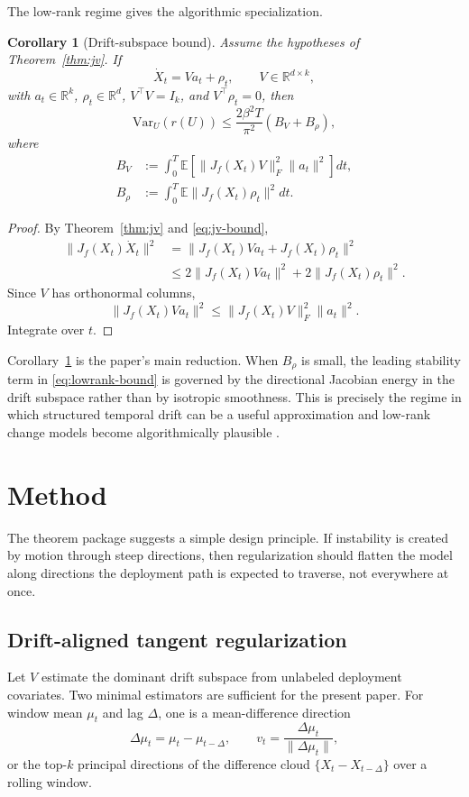 \documentclass[conference]{IEEEtran}
\newtheorem{corollary}{Corollary}
\newcommand{\E}{\mathbb{E}}
\newcommand{\Var}{\mathrm{Var}}
\newcommand{\R}{\mathbb{R}}
\begin{document}
The low-rank regime gives the algorithmic specialization.

\begin{corollary}[Drift-subspace bound]
\label{cor:lowrank}
Assume the hypotheses of Theorem~\ref{thm:jv}. If
\[
\dot X_t = Va_t + \rho_t,
\qquad
V\in\R^{d\times k},
\]
with $a_t\in\R^k$, $\rho_t\in\R^d$, $V^\top V=I_k$, and $V^\top \rho_t=0$, then
\begin{equation}
\label{eq:lowrank-bound}
\Var_U(r(U))
\le
\frac{2\beta^2 T}{\pi^2}(B_V+B_\rho),
\end{equation}
where
\begin{align*}
B_V &:= \int_0^T \E[\|J_f(X_t)V\|_F^2\|a_t\|^2]dt, \\
B_\rho &:= \int_0^T \E\|J_f(X_t)\rho_t\|^2dt.
\end{align*}
\end{corollary}

\begin{proof}
By Theorem~\ref{thm:jv} and \eqref{eq:jv-bound},
\[
\begin{aligned}
\|J_f(X_t)\dot X_t\|^2
&=
\|J_f(X_t)Va_t+J_f(X_t)\rho_t\|^2 \\
&\le
2\|J_f(X_t)Va_t\|^2+2\|J_f(X_t)\rho_t\|^2.
\end{aligned}
\]
Since $V$ has orthonormal columns,
\[
\|J_f(X_t)Va_t\|^2 \le \|J_f(X_t)V\|_F^2\|a_t\|^2.
\]
Integrate over $t$.
\end{proof}

Corollary~\ref{cor:lowrank} is the paper's main reduction. When $B_\rho$ is small, the leading stability term in \eqref{eq:lowrank-bound} is governed by the directional Jacobian energy in the drift subspace rather than by isotropic smoothness. This is precisely the regime in which structured temporal drift can be a useful approximation \cite{yao-wildtime} and low-rank change models become algorithmically plausible \cite{xie-lowrank-allerton2016}.

\section{Method}
The theorem package suggests a simple design principle. If instability is created by motion through steep directions, then regularization should flatten the model along directions the deployment path is expected to traverse, not everywhere at once.

\subsection{Drift-aligned tangent regularization}
Let $V$ estimate the dominant drift subspace from unlabeled deployment covariates. Two minimal estimators are sufficient for the present paper. For window mean $\mu_t$ and lag $\Delta$, one is a mean-difference direction
\[
\Delta\mu_t=\mu_t-\mu_{t-\Delta},
\qquad
v_t=\frac{\Delta\mu_t}{\|\Delta\mu_t\|},
\]
or the top-$k$ principal directions of the difference cloud $\{X_t-X_{t-\Delta}\}$ over a rolling window.
\end{document}
